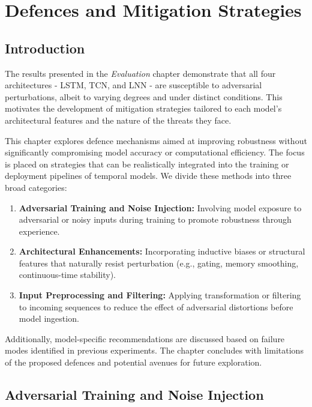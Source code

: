 \chapter{Defences and Mitigation Strategies}

\section{Introduction}

The results presented in the \textit{Evaluation} chapter demonstrate that all four architectures - LSTM, TCN, and LNN - are susceptible to adversarial perturbations, albeit to varying degrees and under distinct conditions. This motivates the development of mitigation strategies tailored to each model’s architectural features and the nature of the threats they face.

This chapter explores defence mechanisms aimed at improving robustness without significantly compromising model accuracy or computational efficiency. The focus is placed on strategies that can be realistically integrated into the training or deployment pipelines of temporal models. We divide these methods into three broad categories:

\begin{enumerate}
    \item \textbf{Adversarial Training and Noise Injection:} Involving model exposure to adversarial or noisy inputs during training to promote robustness through experience.
    
    \item \textbf{Architectural Enhancements:} Incorporating inductive biases or structural features that naturally resist perturbation (e.g., gating, memory smoothing, continuous-time stability).
    
    \item \textbf{Input Preprocessing and Filtering:} Applying transformation or filtering to incoming sequences to reduce the effect of adversarial distortions before model ingestion.
\end{enumerate}

Additionally, model-specific recommendations are discussed based on failure modes identified in previous experiments. The chapter concludes with limitations of the proposed defences and potential avenues for future exploration.

\section{Adversarial Training and Noise Injection}

